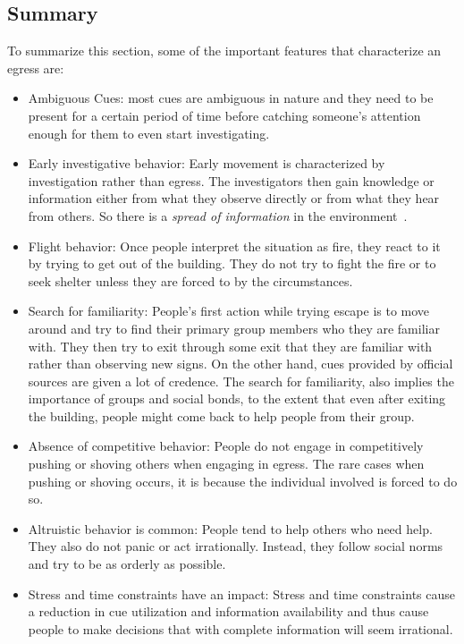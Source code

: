 \subsection{Summary}
\label{LiteratureReview:PsychSummary}

To summarize this section, some of the important features that characterize an egress are:
\begin{itemize}
\item Ambiguous Cues: most cues are ambiguous in nature and they need to be present for a certain period of time before catching someone's attention enough for them to even start investigating.
\item Early investigative behavior: Early movement is characterized by investigation rather than egress. The investigators then gain knowledge or information either from what they observe directly or from what they hear from others. So there is a \emph{spread of information} in the environment~\cite{Fahy:2010to,Purser:2001ts}.
\item Flight behavior: Once people interpret the situation as fire, they react to it by trying to get out of the building. They do not try to fight the fire or to seek shelter unless they are forced to by the circumstances.
\item Search for familiarity: People's first action while trying escape is to move around and try to find their primary group members who they are familiar with. They then try to exit through some exit that they are familiar with rather than observing new signs. On the other hand, cues provided by official sources are given a lot of credence. The search for familiarity, also implies the importance of groups and social bonds, to the extent that even after exiting the building, people might come back to help people from their group.
\item Absence of competitive behavior: People do not engage in competitively pushing or shoving others when engaging in egress. The rare cases when pushing or shoving occurs, it is because the individual involved is forced to do so.
\item Altruistic behavior is common: People tend to help others who need help. They also do not panic or act irrationally. Instead, they follow social norms and try to be as orderly as possible.
\item Stress and time constraints have an impact: Stress and time constraints cause a reduction in cue utilization and information availability and thus cause people to make decisions that with complete information will seem irrational.

\end{itemize}
